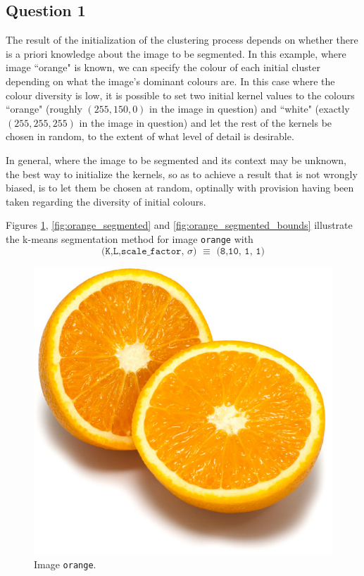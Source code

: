 \subsection{Question 1}

The result of the initialization of the clustering process depends on whether
there is a priori knowledge about the image to be segmented. In this example,
where image ``orange" is known, we can specify the colour of each initial
cluster depending on what the image's dominant colours are. In this case where
the colour diversity is low, it is possible to set two initial kernel values
to the colours ``orange" (roughly $(255,150,0)$ in the image in question)
and ``white" (exactly $(255,255,255)$ in the image in question)
and let the rest of the kernels be chosen in random,
to the extent of what level of detail is desirable.

In general, where the image to be segmented and its context may be unknown,
the best way to initialize the kernels, so as to achieve a result that is not
wrongly biased, is to let them be chosen at random, optinally with provision
having been taken regarding the diversity of initial colours.

Figures \ref{fig:orange}, \ref{fig:orange_segmented}
and \ref{fig:orange_segmented_bounds} illustrate the k-means segmentation
method for image \texttt{orange} with
$$\texttt{(K,L,scale\_factor, $\sigma$) $\equiv$ (8,10, 1, 1)}$$


\begin{figure}[H]
	\centering
  \includegraphics[scale=0.4]{../../bildat_lab3/orange.jpg}
  \caption{Image \texttt{orange}.}
  \label{fig:orange}
\end{figure}


